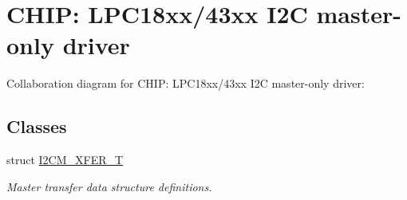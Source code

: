 \hypertarget{group___i2_c_m__18_x_x__43_x_x}{}\section{C\+H\+IP\+: L\+P\+C18xx/43xx I2C master-\/only driver}
\label{group___i2_c_m__18_x_x__43_x_x}
Collaboration diagram for C\+H\+IP\+: L\+P\+C18xx/43xx I2C master-\/only driver\+:
\subsection*{Classes}
\begin{DoxyCompactItemize}
\item 
struct \hyperlink{struct_i2_c_m___x_f_e_r___t}{I2\+C\+M\+\_\+\+X\+F\+E\+R\+\_\+T}
\begin{DoxyCompactList}\small\item\em Master transfer data structure definitions. \end{DoxyCompactList}\end{DoxyCompactItemize}
